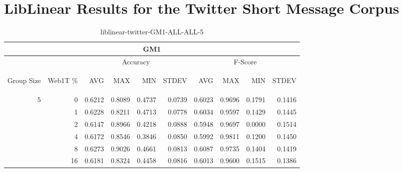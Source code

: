 \chapter{LibLinear Results for the Twitter Short Message Corpus}

\begin{center}
\begin{table}[htbp]
\begin{tabular}{ | r | r | r | r | r | r | r | r | r | r |}
\hline
\multicolumn{10}{|c|}{GM1}\\
\hline
 & & \multicolumn{4}{|c|}{Accuracy} & \multicolumn{4}{|c|}{F-Score}\\ \cline{3-10}
\begin{sideways}Group Size\end{sideways} & \begin{sideways}Web1T \%\end{sideways} & \begin{sideways}AVG\end{sideways} & \begin{sideways}MAX\end{sideways} & \begin{sideways}MIN\end{sideways} & \begin{sideways}STDEV\end{sideways} & \begin{sideways}AVG\end{sideways} & \begin{sideways}MAX\end{sideways} & \begin{sideways}MIN\end{sideways} & \begin{sideways}STDEV\end{sideways}\\
\hline
\multirow{6}{*}{5}
 & 0 & 0.6212 & 0.8089 & 0.4737 & 0.0739 & 0.6023 & 0.9696 & 0.1791 & 0.1416\\ \cline{2-10}
 & 1 & 0.6228 & 0.8211 & 0.4713 & 0.0778 & 0.6034 & 0.9597 & 0.1429 & 0.1445\\ \cline{2-10}
 & 2 & 0.6147 & 0.8966 & 0.4218 & 0.0888 & 0.5948 & 0.9697 & 0.0000 & 0.1514\\ \cline{2-10}
 & 4 & 0.6172 & 0.8546 & 0.3846 & 0.0850 & 0.5992 & 0.9811 & 0.1200 & 0.1450\\ \cline{2-10}
 & 8 & 0.6273 & 0.9026 & 0.4661 & 0.0813 & 0.6087 & 0.9735 & 0.1404 & 0.1419\\ \cline{2-10}
 & 16 & 0.6181 & 0.8324 & 0.4458 & 0.0816 & 0.6013 & 0.9600 & 0.1515 & 0.1386\\ \cline{2-10}
\hline
\end{tabular}
\caption{liblinear-twitter-GM1-ALL-ALL-5}
\end{table}
\end{center}

